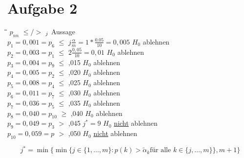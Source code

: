 \documentclass[10pt,a4paper]{article}
\begin{document}
\section*{Aufgabe 2}
\begin{tabbing}
	\hspace{90pt}\=\hspace{30pt}\=\hspace{130pt}\=\kill
	\(p_{nn}\)\> \(\leq / >\)   \> \(\title{\alpha}_{j}\)  \> Aussage\\	
	\(p_{1} = 0,001 = p_{6}\)	\> \(\leq\)	\> \(j\frac{\alpha}{m} = 1 *\frac{0.05}{10} = 0,005\)  \> \(H_0\) ablehnen \\	
	\(p_{2} = 0,003 = p_{1}\)	\> \(\leq\)	\> \(2 \frac{0,05}{10} = 0,01\)  \>  \(H_0\) ablehnen\\	
	\(p_{3} = 0,004 = p_{9}\)	\> \(\leq\)	,015	\> \(H_0\) ablehnen \\	
	\(p_{4} = 0,005 = p_{2}\)	\> \(\leq\)	,020	\> \(H_0\) ablehnen \\	
	\(p_{5} = 0,008 = p_{4}\)	\> \(\leq\)	,025	\> \(H_0\) ablehnen\\	
	\(p_{6} = 0,011 = p_{7}\)	\> \(\leq\) ,030	\> \(H_0\) ablehnen\\	
	\(p_{7} = 0,036 = p_{5}\)	\> \(\leq\) ,035	\>  \(H_0\) ablehnen\\	
	\(p_{8} = 0,040 = p_{10}\)	\>\(\geq\)  ,040	\>\(H_0\) ablehnen\\	
	\(p_{9} = 0,049 = p_{3}\)	\> \(>\) 	,045 \(j^* = 9\)	\> \(H_0\) \underline{nicht} ablehnen \\	
	\(p_{10} = 0,059 = p_{}\)	\> \(>\) 	,050	\>  \(H_0\) \underline{nicht} ablehnen\\		
\end{tabbing} 	
\[j^* = \min\{ \min\{ j \in \{1, \ldots, m\} : p(k) > \tilde{\alpha}_k \text{für alle } k \in \{j, \ldots,m\} \}, m+1\}\]
\end{document}
